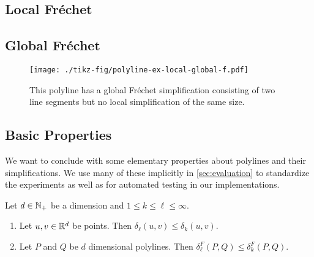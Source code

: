 
\subsection{Local Fréchet}

\subsection{Global Fréchet}

\begin{figure}[b]
  \centering
  \texttt{[image: ./tikz-fig/polyline-ex-local-global-f.pdf]}
  \caption{This polyline has a global Fréchet simplification consisting of two line segments but no local simplification of the same size.}
  \label{fig:polyline-ex-local-global-f}
\end{figure}

\subsection{Basic Properties}
We want to conclude with some elementary properties about polylines and their simplifications. We use many of these implicitly in \cref{sec:evaluation} to standardize the experiments as well as for automated testing in our implementations.

\begin{lemma}\label{lem:monotonicity_minkowski}
  Let \(d \in \mathbb{N}_+\) be a dimension and \(1 \leq k \leq \ell \leq \infty\).
	\begin{enumerate}
		\item Let \(u, v \in \mathbb{R}^d\) be points. Then \(\delta_\ell(u,v) \leq \delta_k(u, v)\).
		\item Let \(P\) and \(Q\) be \(d\) dimensional polylines. Then \(\delta_\ell^F(P, Q) \leq \delta_k^F(P, Q)\).
	\end{enumerate}
\end{lemma}

